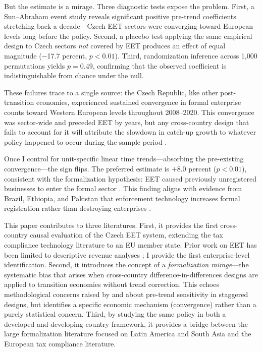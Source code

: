 \documentclass[12pt]{article}
\begin{document}
But the estimate is a mirage. Three diagnostic tests expose the problem. First, a Sun--Abraham event study \citep{sun2021} reveals significant positive pre-trend coefficients stretching back a decade---Czech EET sectors were converging toward European levels long before the policy. Second, a placebo test applying the same empirical design to Czech sectors \textit{not} covered by EET produces an effect of equal magnitude ($-$17.7 percent, $p < 0.01$). Third, randomization inference across 1,000 permutations yields $p = 0.49$, confirming that the observed coefficient is indistinguishable from chance under the null.

These failures trace to a single source: the Czech Republic, like other post-transition economies, experienced sustained convergence in formal enterprise counts toward Western European levels throughout 2008--2020. This convergence was sector-wide and preceded EET by years, but any cross-country design that fails to account for it will attribute the slowdown in catch-up growth to whatever policy happened to occur during the sample period \citep{roth2023}.

Once I control for unit-specific linear time trends---absorbing the pre-existing convergence---the sign flips. The preferred estimate is $+$8.0 percent ($p < 0.01$), consistent with the formalization hypothesis: EET caused previously unregistered businesses to enter the formal sector \citep{naritomi2019, ulyssea2018}. This finding aligns with evidence from Brazil, Ethiopia, and Pakistan that enforcement technology increases formal registration rather than destroying enterprises \citep{pomeranz2015, okunogbe2022, waseem2018}.

This paper contributes to three literatures. First, it provides the first cross-country causal evaluation of the Czech EET system, extending the tax compliance technology literature \citep{slemrod2019, kleven2011} to an EU member state. Prior work on EET has been limited to descriptive revenue analyses \citep{slavkova2019}; I provide the first enterprise-level identification. Second, it introduces the concept of a \textit{formalization mirage}---the systematic bias that arises when cross-country difference-in-differences designs are applied to transition economies without trend correction. This echoes methodological concerns raised by \citet{rambachan2023} and \citet{goodman2021} about pre-trend sensitivity in staggered designs, but identifies a specific economic mechanism (convergence) rather than a purely statistical concern. Third, by studying the same policy in both a developed and developing-country framework, it provides a bridge between the large formalization literature focused on Latin America and South Asia \citep{la_porta2014, bruhn2011, fajnzylber2011} and the European tax compliance literature.
\end{document}

